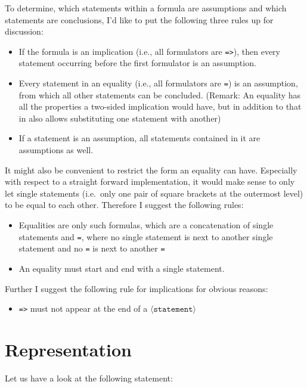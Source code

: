 \documentclass[british]{article}
\newcommand\prv{bc}
\newcommand\m[1]{\texttt{#1}}
\newenvironment{code}{\captionsetup{type=listing}}{}
\begin{document}
To determine, which statements within a formula are assumptions and
which statements are conclusions, I'd like to put the following three
rules up for discussion:
\begin{itemize}
\item If the formula is an implication (i.e., all formulators are \m{=>}),
then every statement occurring before the first formulator is an assumption.
\item Every statement in an equality (i.e., all formulators are \m{=})
is an assumption, from which all other statements can be concluded.
(Remark: An equality has all the properties a two-sided implication
would have, but in addition to that in also allows substituting one
statement with another)
\item If a statement is an assumption, all statements contained in it are
assumptions as well.
\end{itemize}
\medskip{}

It might also be convenient to restrict the form an equality can have.
Especially with respect to a straight forward implementation, it would
make sense to only let single statements (i.e.\ only one pair of square
brackets at the outermost level) to be equal to each other. Therefore
I suggest the following rules:
\begin{itemize}
\item Equalities are only such formulas, which are a concatenation of single
statements and \m{=}, where no single statement is next to another
single statement and no \m{=} is next to another \m{=}
\item An equality must start and end with a single statement.
\end{itemize}
\medskip{}
Further I suggest the following rule for implications for obvious
reasons:
\begin{itemize}
\item \m{=>} must not appear at the end of a $\langle\texttt{statement}\rangle$
\end{itemize}
\pagebreak{}

\section{Representation}

Let us have a look at the following statement:

\begin{code}
\label{code:first}
\inputminted[linenos]{\prv}{examples/exmp1.prove}
\end{code}
\end{document}
